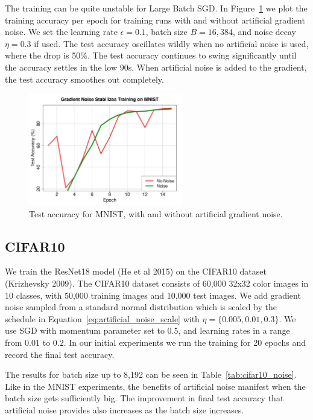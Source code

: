 \documentclass{article} %
\begin{document}
The training can be quite unstable for Large Batch SGD.
In Figure~\ref{fig:mnist_stable} we plot the training accuracy per epoch for training runs with and without artificial gradient noise.
We set the learning rate $\epsilon = 0.1$, batch size $B = 16,384$, and noise decay $\eta = 0.3$ if used.
The test accuracy oscillates wildly when no artificial noise is used, where the drop is 50\%.
The test accuracy continues to swing significantly until the accuracy settles in the low 90s.
When artificial noise is added to the gradient, the test accuracy smoothes out completely.

\begin{figure}[t]
\begin{center}
  \includegraphics[width=0.6\textwidth]{mnistNoise.pdf}
\end{center}
\caption{Test accuracy for MNIST, with and without artificial gradient noise.}
\label{fig:mnist_stable}
\end{figure}


\subsection{CIFAR10}
We train the ResNet18 model (He et al 2015) on the CIFAR10 dataset (Krizhevsky 2009). 
The CIFAR10 dataset consists of 60,000 32x32 color images in 10 classes, with 50,000 training images and 10,000 test images.
We add gradient noise sampled from a standard normal distribution which is scaled by the schedule in Equation~\ref{eq:artificial_noise_scale} with $\eta = \{ 0.005, 0.01, 0.3 \}$.
We use SGD with momentum parameter set to $0.5$, and learning rates in a range from $0.01$ to $0.2$.
In our initial experiments we run the training for 20 epochs and record the final test accuracy.

The results for batch size up to 8,192 can be seen in Table~\ref{tab:cifar10_noise}.
Like in the MNIST experiments, the benefits of artificial noise manifest when the batch size gets sufficiently big.
The improvement in final test accuracy that artificial noise provides also increases as the batch size increases.
\end{document}
